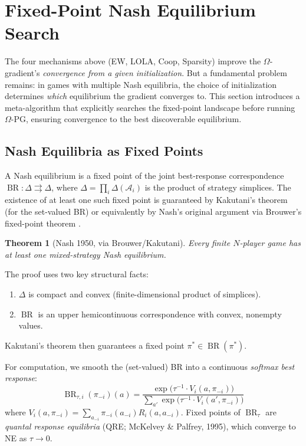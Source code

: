 \documentclass[11pt,a4paper]{article}
\newtheorem{theorem}{Theorem}[section]
\DeclareMathOperator{\BR}{BR}
\begin{document}
\section{Fixed-Point Nash Equilibrium Search}\label{sec:fpne}

The four mechanisms above (EW, LOLA, Coop, Sparsity) improve the
$\Omega$-gradient's \emph{convergence from a given initialization}.
But a fundamental problem remains: in games with multiple Nash
equilibria, the choice of initialization determines \emph{which}
equilibrium the gradient converges to. This section introduces a
meta-algorithm that explicitly searches the fixed-point landscape
before running $\Omega$-PG, ensuring convergence to the best
discoverable equilibrium.

\subsection{Nash Equilibria as Fixed Points}

A Nash equilibrium is a fixed point of the joint best-response
correspondence $\BR : \Delta \rightrightarrows \Delta$, where
$\Delta = \prod_i \Delta(\mathcal{A}_i)$ is the product of strategy
simplices. The existence of at least one such fixed point is guaranteed
by Kakutani's theorem \cite{kakutani1941} (for the set-valued BR) or
equivalently by Nash's original argument via Brouwer's fixed-point
theorem \cite{nash1950}.

\begin{theorem}[Nash 1950, via Brouwer/Kakutani]
Every finite $N$-player game has at least one mixed-strategy Nash
equilibrium.
\end{theorem}

The proof uses two key structural facts:
\begin{enumerate}
    \item $\Delta$ is compact and convex (finite-dimensional product of simplices).
    \item $\BR$ is an upper hemicontinuous correspondence with convex, nonempty values.
\end{enumerate}
Kakutani's theorem then guarantees a fixed point $\pi^* \in \BR(\pi^*)$.

For computation, we smooth the (set-valued) BR into a continuous
\emph{softmax best response}:
\begin{equation}\label{eq:soft-br}
    \BR_{\tau,i}(\pi_{-i})(a) = \frac{\exp\!\big(\tau^{-1} \cdot V_i(a, \pi_{-i})\big)}
    {\sum_{a'} \exp\!\big(\tau^{-1} \cdot V_i(a', \pi_{-i})\big)}
\end{equation}
where $V_i(a, \pi_{-i}) = \sum_{a_{-i}} \pi_{-i}(a_{-i}) R_i(a, a_{-i})$.
Fixed points of $\BR_\tau$ are \emph{quantal response equilibria} (QRE;
McKelvey \& Palfrey, 1995), which converge to NE as $\tau \to 0$.
\end{document}
